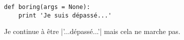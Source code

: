 \documentclass[10pt,a4paper]{article}
\begin{document}
\begin{verbatim}
def boring(args = None):
    print 'Je suis dépassé...'
\end{verbatim}


Je continue à être |'...dépassé...'| mais cela ne marche pas.
\end{document}
